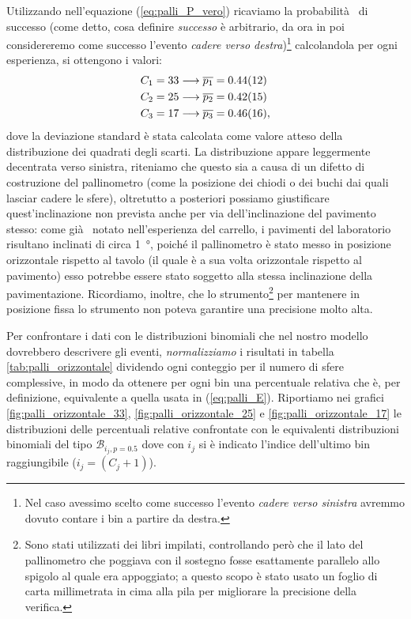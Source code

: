 \documentclass[10pt,oneside,a4paper]{article}
\begin{document}
Utilizzando nell'equazione (\ref{eq:palli_P_vero}) ricaviamo la probabilità  di successo (come detto, cosa definire \emph{successo} è arbitrario, da ora in poi considereremo come successo l'evento \emph{cadere verso destra})\footnote{Nel caso avessimo scelto come successo l'evento \emph{cadere verso sinistra} avremmo dovuto contare i bin a partire da destra.} calcolandola per ogni esperienza, si ottengono i valori:
\begin{align*}
	C_1 = 33 &\longrightarrow \overline{p_1} = \SI{0.44 \pm 0.12}{} \\ 
	C_2 = 25 &\longrightarrow \overline{p_2} = \SI{0.42 \pm 0.15}{} \\
	C_3 = 17 &\longrightarrow \overline{p_3} = \SI{0.46 \pm 0.16}{},
\end{align*}
dove la deviazione standard è stata calcolata come valore atteso della distribuzione dei quadrati degli scarti. La distribuzione appare leggermente decentrata verso sinistra, riteniamo che questo sia a causa di un difetto di costruzione del pallinometro (come la posizione dei chiodi o dei buchi dai quali lasciar cadere le sfere), oltretutto a posteriori possiamo giustificare quest'inclinazione non prevista anche per via dell'inclinazione del pavimento stesso: come già  notato nell'esperienza del carrello, i pavimenti del laboratorio risultano inclinati di circa \SI{1}{°}, poiché il pallinometro è stato messo in posizione orizzontale rispetto al tavolo (il quale è a sua volta orizzontale rispetto al pavimento) esso potrebbe essere stato soggetto alla stessa inclinazione della pavimentazione. Ricordiamo, inoltre, che lo strumento\footnote{Sono stati utilizzati dei libri impilati, controllando però che il lato del pallinometro che poggiava con il sostegno fosse esattamente parallelo allo spigolo al quale era appoggiato; a questo scopo è stato usato un foglio di carta millimetrata in cima alla pila per migliorare la precisione della verifica.} per mantenere in posizione fissa lo strumento non poteva garantire una precisione molto alta.

Per confrontare i dati con le distribuzioni binomiali che nel nostro modello dovrebbero descrivere gli eventi, \emph{normalizziamo} i risultati in tabella \ref{tab:palli_orizzontale} dividendo ogni conteggio per il numero di sfere complessive, in modo da ottenere per ogni bin una percentuale relativa che è, per definizione, equivalente a quella usata in (\ref{eq:palli_E}). Riportiamo nei grafici \ref{fig:palli_orizzontale_33}, \ref{fig:palli_orizzontale_25} e \ref{fig:palli_orizzontale_17} le distribuzioni delle percentuali relative confrontate con le equivalenti distribuzioni binomiali del tipo $\mathscr{B}_{i_j, p=0.5}$ dove con $i_j$ si è indicato l'indice dell'ultimo bin raggiungibile ($i_j = (C_j+1)$).
\end{document}

